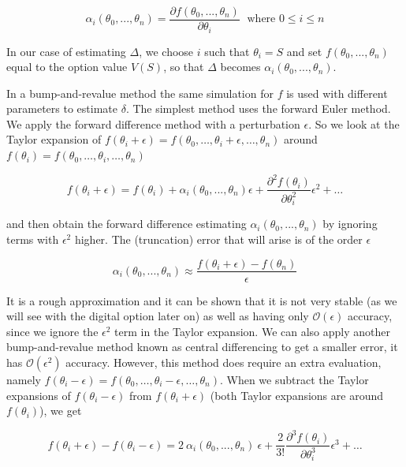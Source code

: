 \documentclass[11pt,a4paper]{article}
\begin{document}
\begin{equation}
  \alpha_i(\theta_0,...,\theta_n) = \frac{\partial f(\theta_0,...,\theta_n)}{\partial \theta_i} \; \text{ where } 0 \leq i \leq n
\end{equation}

In our case of estimating $\Delta$, we choose $i$ such that $\theta_i=S$ and set $f(\theta_0,...,\theta_n)$ equal to the option value $V(S)$, so that $\Delta$ becomes $\alpha_i(\theta_0,...,\theta_n)$.

In a bump-and-revalue method the same simulation for $f$ is used with different parameters to estimate $\delta$. The simplest method uses the forward Euler method. We apply the forward difference method with a perturbation $\epsilon$. So we look at the Taylor expansion of $f(\theta_i+\epsilon)=f(\theta_0,\ldots,\theta_i+\epsilon,\ldots,\theta_n)$ around $f(\theta_i)=f(\theta_0,\ldots,\theta_i,\ldots,\theta_n)$

\begin{equation}
f(\theta_i+\epsilon)=f(\theta_i)+\alpha_i(\theta_0,...,\theta_n)\epsilon+\frac{\partial^2 f(\theta_i)}{\partial \theta_i^2}\epsilon^2+\ldots
\end{equation}

and then obtain the forward difference estimating $\alpha_i(\theta_0,...,\theta_n)$ by ignoring terms with $\epsilon^2$ higher. The (truncation) error that will arise is of the order $\epsilon$

\begin{equation}
  \alpha_i(\theta_0,...,\theta_n) \approx \frac{f(\theta_i + \epsilon) - f(\theta_n)}{\epsilon}
\end{equation}

It is a rough approximation and it can be shown that it is not very stable (as we will see with the digital option later on) as well as having only $\mathcal{O}(\epsilon)$ accuracy, since we ignore the $\epsilon^2$ term in the Taylor expansion. We can also apply another bump-and-revalue method known as central differencing to get a smaller error, it has $\mathcal{O}(\epsilon^2)$ accuracy. However, this method does require an extra evaluation, namely $f(\theta_i-\epsilon)=f(\theta_0,\ldots,\theta_i-\epsilon,\ldots,\theta_n)$. When we subtract the Taylor expansions of $f(\theta_i-\epsilon)$ from $f(\theta_i+\epsilon)$  (both Taylor expansions are around $f(\theta_i)$), we get

\begin{equation}
f(\theta_i+\epsilon)-f(\theta_i-\epsilon)=2~\alpha_i(\theta_0,...,\theta_n)~\epsilon + \frac{2}{3!}\frac{\partial^3f(\theta_i)}{\partial \theta_i^3}\epsilon^3+\ldots
\end{equation}
\end{document}
